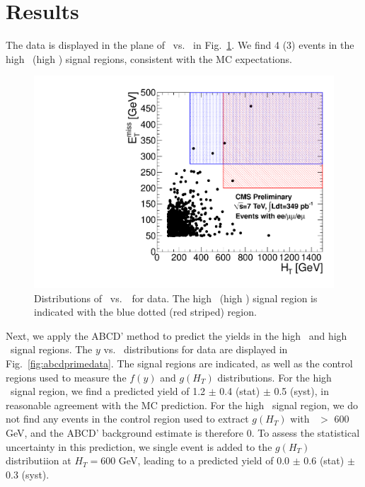 \section{Results}
\label{sec:results}

The data is displayed in the plane of \MET\ vs. \Ht\ in Fig.~\ref{fig:met_ht}.
We find 4 (3) events in the high \MET\ (high \Ht) signal regions, consistent
with the MC expectations. 

\begin{figure}[tbh]
\begin{center}
\includegraphics[width=0.65\linewidth]{plots_final/met_ht_349pb.pdf}
\caption{\label{fig:met_ht}\protect Distributions of \MET\ vs.\ \HT\   
for data. The high \MET\ (high \Ht) signal region is indicated with the
blue dotted (red striped) region.}
\end{center}
\end{figure}

Next, we apply the ABCD' method to predict the yields in the high \met\ and high \Ht\
signal regions. 
The $y$ vs. \Ht\ distributions for data are displayed in 
Fig.~\ref{fig:abcdprimedata}. 
The signal regions are indicated, as well as the control 
regions used to measure the $f(y)$ and $g(H_T)$ distributions. 
For the high \met\
signal region, we find a predicted yield of 1.2 $\pm$ 0.4 (stat) $\pm$ 0.5 (syst), 
in reasonable agreement with the MC prediction. For the high \Ht\ signal region, we 
do not find any events in the control region used to extract $g(H_T)$ with \Ht\ $>$ 600 GeV,
and the ABCD' background estimate is therefore 0. To assess the statistical uncertainty
in this prediction, we single event is added to the $g(H_T)$ distributiion
at $H_T = 600$ GeV, leading to a predicted yield of 0.0 $\pm$ 0.6 (stat) $\pm$ 0.3 (syst).

